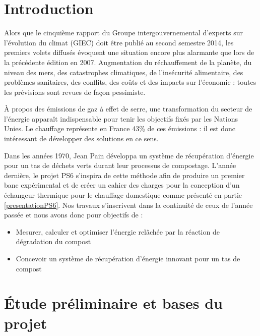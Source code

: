 \documentclass[a4paper,11pt,french]{article}
\begin{document}


\section*{Introduction}

Alors que le cinquième rapport du Groupe intergouvernemental d'experts sur l'évolution du climat (GIEC) doit être publié au second semestre 2014, les premiers volets diffusés évoquent une situation encore plus alarmante que lors de la précédente édition en 2007. Augmentation du réchauffement de la planète, du niveau des mers, des catastrophes climatiques, de l'insécurité alimentaire, des problèmes sanitaires, des conflits, des coûts et des impacts sur l'économie : toutes les prévisions sont revues de façon pessimiste.

À propos des émissions de gaz à effet de serre, une transformation du secteur de l'énergie apparaît indispensable pour tenir les objectifs fixés par les Nations Unies. Le chauffage représente en France 43\% de ces émissions : il est donc intéressant de développer des solutions en ce sens.

Dans les années 1970, Jean Pain développa un système de récupération d'énergie pour un tas de déchets verts durant leur processus de compostage. L'année dernière, le projet PS6 s'inspira de cette méthode afin de produire un premier banc expérimental et de créer un cahier des charges pour la conception d'un échangeur thermique pour le chauffage domestique comme présenté en partie \ref{presentationPS6}. Nos travaux s'inscrivent dans la continuité de ceux de l'année passée et nous avons donc pour objectifs de :
\begin{itemize}
\item Mesurer, calculer et optimiser l'énergie relâchée par la réaction de dégradation du compost
\item Concevoir un système de récupération d'énergie innovant pour un tas de compost 
\end{itemize}

\clearpage

\tableofcontents

\clearpage

\section{Étude préliminaire et bases du projet}


\end{document}
